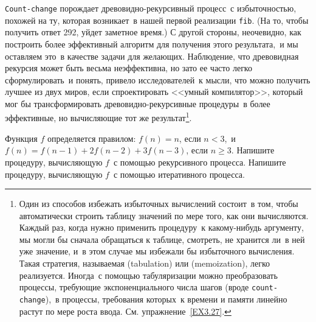 {\tt Count-change} порождает 
древовидно-рекурсивный
процесс~с избыточностью, похожей на ту, которая возникает~в нашей
первой реализации {\tt fib}. (На то, чтобы получить ответ 292,
уйдет заметное время.) С другой стороны, неочевидно, как построить
более эффективный алгоритм для получения этого результата,~и мы
оставляем это~в качестве задачи для желающих.  Наблюдение, что древовидная
рекурсия может быть весьма неэффективна, но зато ее часто легко 
сформулировать~и понять, привело исследователей~к мысли, что можно
получить лучшее из двух миров, если спроектировать <<умный
компилятор>>, который мог бы трансформировать древовидно-рекурсивные
процедуры~в более эффективные, но вычисляющие тот же результат\footnote{Один из способов избежать избыточных вычислений
состоит~в том, чтобы автоматически строить таблицу значений по мере
того, как они вычисляются.  Каждый раз, когда нужно применить
процедуру~к какому-нибудь аргументу, мы могли бы сначала обращаться к
таблице, смотреть, не хранится ли~в ней уже значение, и~в этом 
случае мы избежали бы избыточного вычисления.  Такая стратегия,
называемая  (tabulation) или
 (memoization), легко реализуется.
Иногда~с помощью табуляризации можно
преобразовать процессы, требующие экспоненциального числа шагов (вроде 
{\tt count-change}),~в процессы, требования которых~к времени и
памяти линейно растут по мере роста ввода. См. упражнение~\ref{EX3.27}.}.
\begin{exercise}{1.11}%
\label{EX1.11}%
Функция $f$ определяется правилом: $f(n) = 
n$, если $n < 3$,~и $f(n) = f(n - 1) + 2 f(n - 2)
+ 3 f(n - 3)$, если $n \ge 3$. Напишите процедуру,
вычисляющую $f$~с помощью рекурсивного процесса.  Напишите
процедуру, вычисляющую $f$~с помощью итеративного процесса.
\end{exercise}
